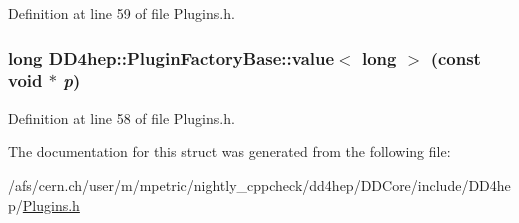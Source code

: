 Definition at line 59 of file Plugins.h.\hypertarget{struct_d_d4hep_1_1_plugin_factory_base_a3b1b68f3c9ddfbb98372fd89f852f372}{
\subsubsection[{value}]{\setlength{\rightskip}{0pt plus 5cm}long DD4hep::PluginFactoryBase::value$<$ long $>$ (const void $\ast$ {\em p})}}
\label{struct_d_d4hep_1_1_plugin_factory_base_a3b1b68f3c9ddfbb98372fd89f852f372}


Definition at line 58 of file Plugins.h.

The documentation for this struct was generated from the following file:\begin{DoxyCompactItemize}
\item 
/afs/cern.ch/user/m/mpetric/nightly\_\-cppcheck/dd4hep/DDCore/include/DD4hep/\hyperlink{_plugins_8h}{Plugins.h}\end{DoxyCompactItemize}
